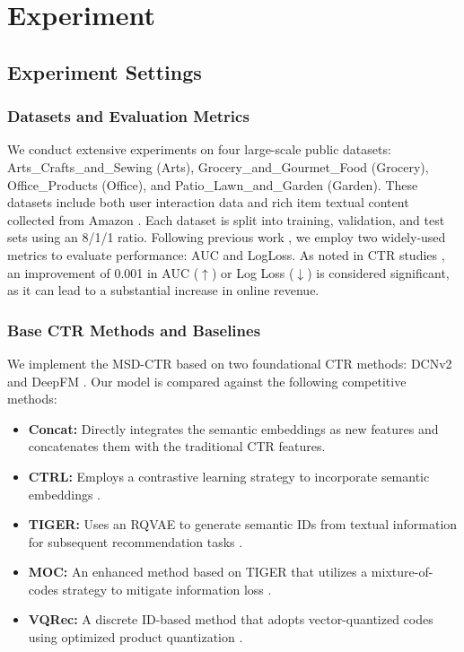 \chapter{Experiment} %

\label{ChapterX} %


\section{Experiment Settings}

\subsection{Datasets and Evaluation Metrics}
\sloppy
We conduct extensive experiments on four large-scale public datasets: Arts\_Crafts\_and\_Sewing (Arts), Grocery\_and\_Gourmet\_Food (Grocery), Office\_Products (Office), and Patio\_Lawn\_and\_Garden (Garden). These datasets include both user interaction data and rich item textual content collected from Amazon \cite{amazon_data}. Each dataset is split into training, validation, and test sets using an 8/1/1 ratio. Following previous work \cite{CTR_work1, CTR_work2}, we employ two widely-used metrics to evaluate performance: AUC and LogLoss. As noted in CTR studies \cite{CTR_study1}, an improvement of 0.001 in AUC (\(\uparrow\)) or Log Loss (\(\downarrow\)) is considered significant, as it can lead to a substantial increase in online revenue.

\subsection{Base CTR Methods and Baselines}
We implement the MSD-CTR based on two foundational CTR methods: DCNv2 \cite{DCNv2} and DeepFM \cite{DeepFM}. Our model is compared against the following competitive methods:
\begin{itemize}
    \item \textbf{Concat:} Directly integrates the semantic embeddings as new features and concatenates them with the traditional CTR features.
    \item \textbf{CTRL:} Employs a contrastive learning strategy to incorporate semantic embeddings \cite{CTRL}.
    \item \textbf{TIGER:} Uses an RQVAE to generate semantic IDs from textual information for subsequent recommendation tasks \cite{TIGER}.
    \item \textbf{MOC:} An enhanced method based on TIGER that utilizes a mixture-of-codes strategy to mitigate information loss \cite{MOC}.
    \item \textbf{VQRec:} A discrete ID-based method that adopts vector-quantized codes using optimized product quantization \cite{VQRec}.
\end{itemize}

